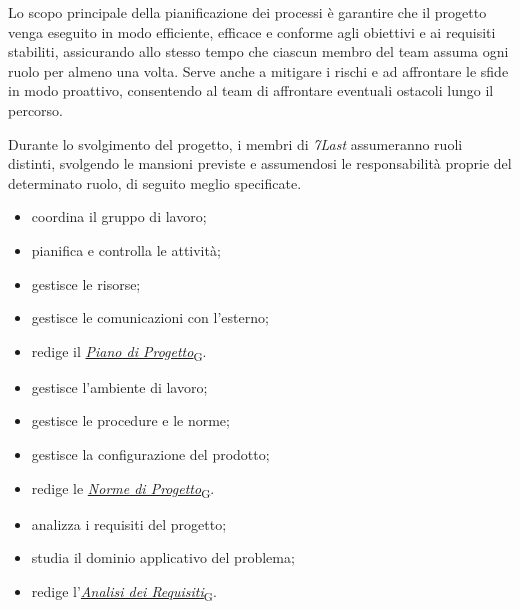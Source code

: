 Lo scopo principale della pianificazione dei processi è garantire che il progetto venga eseguito in modo efficiente, efficace e conforme agli obiettivi e ai requisiti stabiliti, assicurando allo stesso tempo che ciascun membro del team assuma ogni ruolo per almeno una volta. Serve anche a mitigare i rischi e ad affrontare le sfide in modo proattivo, consentendo al team di affrontare eventuali ostacoli lungo il percorso.

Durante lo svolgimento del progetto, i membri di \textit{7Last} assumeranno ruoli distinti, svolgendo le mansioni previste e assumendosi le responsabilità proprie del determinato ruolo, di seguito meglio specificate.

\begin{itemize}
    \item coordina il gruppo di lavoro;
    \item pianifica e controlla le attività;
    \item gestisce le risorse;
    \item gestisce le comunicazioni con l'esterno;
    \item redige il \href{https://7last.github.io/docs/rtb/documentazione-interna/glossario\#piano-di-progetto}{\textit{Piano di Progetto}\textsubscript{G}}.
\end{itemize}

\begin{itemize}
    \item gestisce l'ambiente di lavoro;
    \item gestisce le procedure e le norme;
    \item gestisce la configurazione del prodotto;
    \item redige le \href{https://7last.github.io/docs/rtb/documentazione-interna/glossario\#norme-di-progetto}{\textit{Norme di Progetto}\textsubscript{G}}.
\end{itemize}

\begin{itemize}
    \item analizza i requisiti del progetto;
    \item studia il dominio applicativo del problema;
    \item redige l'\href{https://7last.github.io/docs/rtb/documentazione-interna/glossario\#analisi-dei-requisiti}{\textit{Analisi dei Requisiti}\textsubscript{G}}.
\end{itemize}

